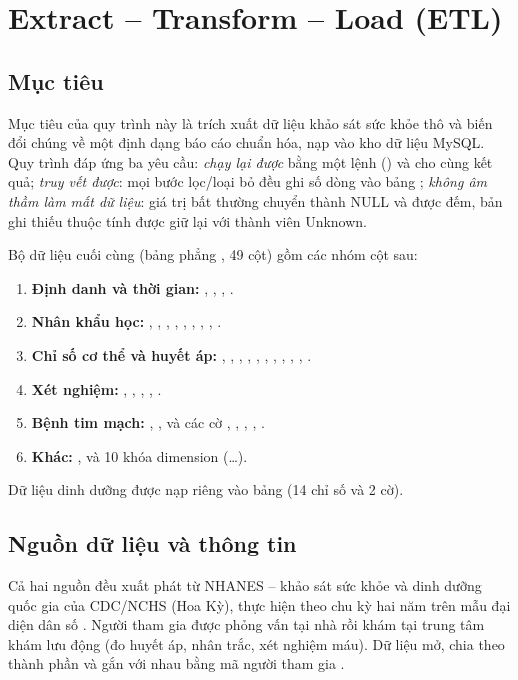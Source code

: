 \chapter{Extract -- Transform -- Load (ETL)}\label{ch:etl}

\section{Mục tiêu}
Mục tiêu của quy trình này là trích xuất dữ liệu khảo sát sức khỏe thô và biến đổi chúng về một định dạng báo cáo chuẩn hóa, nạp vào kho dữ liệu MySQL. Quy trình đáp ứng ba yêu cầu: \emph{chạy lại được} bằng một lệnh () và cho cùng kết quả; \emph{truy vết được}: mọi bước lọc/loại bỏ đều ghi số dòng vào bảng ; \emph{không âm thầm làm mất dữ liệu}: giá trị bất thường chuyển thành NULL và được đếm, bản ghi thiếu thuộc tính được giữ lại với thành viên Unknown.

Bộ dữ liệu cuối cùng (bảng phẳng , 49 cột) gồm các nhóm cột sau:
\begin{enumerate}
\item \textbf{Định danh và thời gian:} , , , .
\item \textbf{Nhân khẩu học:} , , , , , , , , .
\item \textbf{Chỉ số cơ thể và huyết áp:} , , , , , , , , , , .
\item \textbf{Xét nghiệm:} , , , , .
\item \textbf{Bệnh tim mạch:} , ,  và các cờ , , , , .
\item \textbf{Khác:} ,  và 10 khóa dimension (\ldots{}).
\end{enumerate}
Dữ liệu dinh dưỡng được nạp riêng vào bảng  (14 chỉ số và 2 cờ).

\section{Nguồn dữ liệu và thông tin}
Cả hai nguồn đều xuất phát từ NHANES -- khảo sát sức khỏe và dinh dưỡng quốc gia của CDC/NCHS (Hoa Kỳ), thực hiện theo chu kỳ hai năm trên mẫu đại diện dân số \cite{nhanes}. Người tham gia được phỏng vấn tại nhà rồi khám tại trung tâm khám lưu động (đo huyết áp, nhân trắc, xét nghiệm máu). Dữ liệu mở, chia theo thành phần và gắn với nhau bằng mã người tham gia .

